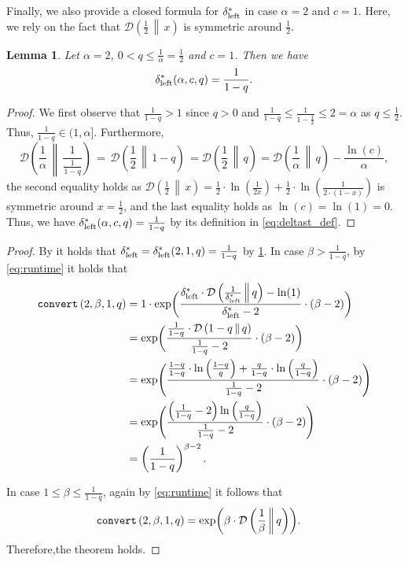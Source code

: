\documentclass[letterpaper,11pt]{article}
\newcommand{\1}[1]{\mathds{1}\left[#1\right]}
\newcommand{\runtime}[1][\alpha, \beta, c, q]{\textnormal{\texttt{convert}}\left(#1\right)}
\newcommand{\D}[2]{\mathcal{D}\left(#1\, \middle\|\,#2 \right)}
\newtheorem{lemma}[theorem]{Lemma}
\newcommand{\sdeltal}{\delta^{*}_{\textnormal{left}}}
\begin{document}
Finally,  we also provide a closed formula for $\sdeltal$ in case $\alpha=2$ and $c=1$. Here, we rely on the fact that $\D{\frac{1}{2}}{x}$ is symmetric around $\frac{1}{2}$. 
\begin{lemma}\label{lemma:sampling_2_approx_alpha_2}
	Let $\alpha = 2$, $0 < q \leq \frac{1}{\alpha} = \frac{1}{2}$ and $c = 1$.
	Then we have
	\begin{equation*}
		\sdeltal(\alpha,c,q) = \frac{1}{1 - q}.
	\end{equation*}
\end{lemma}
\begin{proof}
We first observe that $\frac{1}{1-q} > 1$ since $q>0$ and $\frac{1}{1-q} \leq \frac{1}{1-\frac{1}{2}}\leq 2=\alpha$ as $q\leq \frac{1}{2}$. Thus, $\frac{1}{1-q} \in (1,\alpha]$.  Furthermore,
$$
\D{\frac{1}{\alpha}}{\frac{1}{\frac{1}{1-q}}} \,=\,\D{\frac{1}{2}}{1-q} \, = \D{\frac{1}{2}}{q} = \D{\frac{1}{\alpha}}{q} -\frac{\ln(c)}{\alpha},
$$
the second equality holds as $\D{\frac{1}{2}}{x} =\frac{1}{2}\cdot \ln \left(\frac{1}{2x} \right) + \frac{1}{2}\cdot \ln \left(\frac{1}{2\cdot (1-x)}\right) $ is symmetric around $x=\frac{1}{2}$, and the last equality holds as $\ln(c)=\ln(1)=0$.  Thus, we have $\sdeltal(\alpha,c,q)=\frac{1}{1-q}$ by its definition in \eqref{eq:deltast_def}.
\end{proof}
\simplealphatwo*
\begin{proof}
	 By   it holds that 
	 $\sdeltal=\sdeltal(2,1,q) = \frac{1}{1 - q}$ by \cref{lemma:sampling_2_approx_alpha_2}. 
	In case $\beta>\frac{1}{1-q}$, by  \eqref{eq:runtime} it holds that 
	 \begin{equation*}
	 	\label{eq:simple_alpha_two_first}
	 	\begin{aligned}
	\runtime[2,\beta,1,q]&= 1 \cdot \exp\biggl(\frac{\sdeltal \cdot \D{\frac{1}{\sdeltal}}{q}- \ln(1) }{\sdeltal - 2} \cdot \left( \beta - 2 \right) \biggr)\\
	&= \exp\biggl(\frac{\frac{1}{1-q} \cdot \D{1-q}{q} }{\frac{1}{1-q} - 2} \cdot \left( \beta - 2 \right) \biggr)\\
	& = \exp\Biggl(\frac{\frac{1-q}{1-q} \cdot  \ln \left(\frac{1-q}{q}\right)+ \frac{q}{1-q}\cdot \ln\left( \frac{q}{1-q}\right)}{\frac{1}{1-q} - 2} \cdot \left( \beta - 2 \right) \Biggr)\\
	&=\exp\Biggl(\frac{\left(\frac{1}{1-q}-2\right) \ln\left( \frac{q}{1-q}\right) }{\frac{1}{1-q} - 2} \cdot \left( \beta - 2 \right) \Biggr)\\
	&= \left(\frac{1}{1-q}\right)^{\beta-2}. 
	\end{aligned}
	 \end{equation*}
	  
	 
	
	In case $1 \leq \beta \leq \frac{1}{1 - q}$, again by \eqref{eq:runtime} it follows that
	\begin{align*}
		\runtime[2,\beta,1,q] &=  \exp\biggl(\beta \cdot \D{\frac{1}{\beta}}{q}\biggr).
	\end{align*}
	Therefore,the theorem  holds.
\end{proof}
\end{document}
